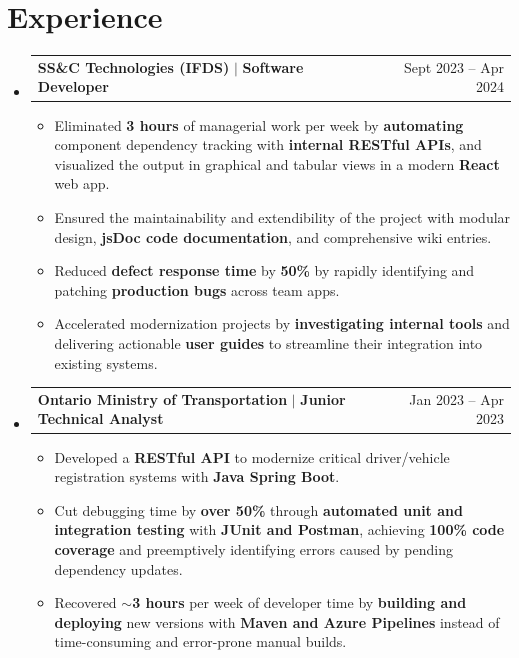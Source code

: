 \documentclass[letterpaper,12pt]{article}
\makeatletter
\newcommand{\resumeItem}[1]{
  \item\small{
    {#1 \vspace{-2pt}}
  }
}
\newcommand{\resumeSubheading}[3]{
  \vspace{-0pt}\item
    \begin{tabular*}{1\textwidth}[t]{l@{\extracolsep{\fill}}r}
      \textbf{#1} $|$ \textbf{#2} & {#3}\\
    \end{tabular*}\vspace{-7pt}
}
\newcommand{\resumeSubHeadingListStart}{\begin{itemize}[leftmargin=0in, label={}]}
\newcommand{\resumeSubHeadingListEnd}{\end{itemize}}
\newcommand{\resumeItemListStart}{\begin{itemize}}
\newcommand{\resumeItemListEnd}{\end{itemize}\vspace{-5pt}}
\makeatother
\begin{document}
\section{Experience}
  \resumeSubHeadingListStart
    \resumeSubheading
      {SS\&C Technologies (IFDS)}{Software Developer}{Sept 2023 -- Apr 2024}
      \resumeItemListStart
      \resumeItem{Eliminated \textbf{3 hours} of managerial work per week by \textbf{automating} component dependency tracking with \textbf{internal RESTful APIs}, and visualized the output in graphical and tabular views in a modern \textbf{React} web app.}
      \resumeItem{Ensured the maintainability and extendibility of the project with modular design, \textbf{jsDoc code documentation}, and comprehensive wiki entries.}
      \resumeItem{Reduced \textbf{defect response time} by \textbf{50\%} by rapidly identifying and patching \textbf{production bugs} across team apps.}
      \resumeItem{Accelerated modernization projects by \textbf{investigating internal tools} and delivering actionable \textbf{user guides} to streamline their integration into existing systems.}
      \resumeItemListEnd

    \resumeSubheading
      {Ontario Ministry of Transportation}{Junior Technical Analyst}{Jan 2023 -- Apr 2023}
      \resumeItemListStart
        \resumeItem{Developed a \textbf{RESTful API} to modernize critical driver/vehicle registration systems with \textbf{Java Spring Boot}.}
        \resumeItem{Cut debugging time by \textbf{over 50\%} through \textbf{automated unit and integration testing} with \textbf{JUnit and Postman}, achieving \textbf{100\% code coverage} and preemptively identifying errors caused by pending dependency updates.}
        \resumeItem{Recovered \textbf{$\sim$3 hours} per week of developer time by \textbf{building and deploying} new versions with \textbf{Maven and Azure Pipelines} instead of time-consuming and error-prone manual builds.}
      \resumeItemListEnd

  \resumeSubHeadingListEnd


\end{document}
